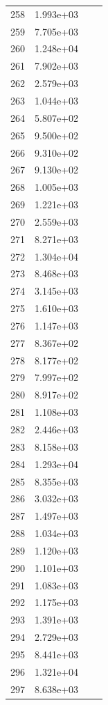 \documentclass[12pt]{article}
\begin{document}
\begin{longtable}{@{}cccc@{}}
258 & 1.993e+03 &  &  \\
259 & 7.705e+03 &  &  \\
260 & 1.248e+04 &  &  \\
261 & 7.902e+03 &  &  \\
262 & 2.579e+03 &  &  \\
263 & 1.044e+03 &  &  \\
264 & 5.807e+02 &  &  \\
265 & 9.500e+02 &  &  \\
266 & 9.310e+02 &  &  \\
267 & 9.130e+02 &  &  \\
268 & 1.005e+03 &  &  \\
269 & 1.221e+03 &  &  \\
270 & 2.559e+03 &  &  \\
271 & 8.271e+03 &  &  \\
272 & 1.304e+04 &  &  \\
273 & 8.468e+03 &  &  \\
274 & 3.145e+03 &  &  \\
275 & 1.610e+03 &  &  \\
276 & 1.147e+03 &  &  \\
277 & 8.367e+02 &  &  \\
278 & 8.177e+02 &  &  \\
279 & 7.997e+02 &  &  \\
280 & 8.917e+02 &  &  \\
281 & 1.108e+03 &  &  \\
282 & 2.446e+03 &  &  \\
283 & 8.158e+03 &  &  \\
284 & 1.293e+04 &  &  \\
285 & 8.355e+03 &  &  \\
286 & 3.032e+03 &  &  \\
287 & 1.497e+03 &  &  \\
288 & 1.034e+03 &  &  \\
289 & 1.120e+03 &  &  \\
290 & 1.101e+03 &  &  \\
291 & 1.083e+03 &  &  \\
292 & 1.175e+03 &  &  \\
293 & 1.391e+03 &  &  \\
294 & 2.729e+03 &  &  \\
295 & 8.441e+03 &  &  \\
296 & 1.321e+04 &  &  \\
297 & 8.638e+03 &  &  \\

\end{longtable}
\end{document}
